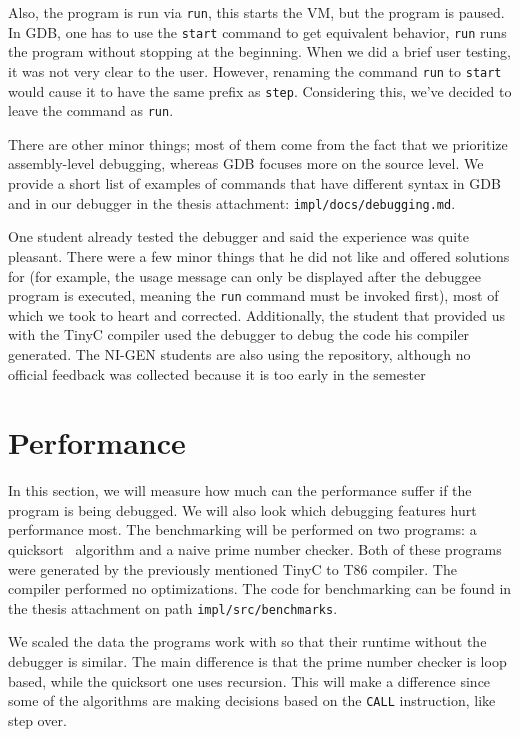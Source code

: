Also, the program is run via \texttt{run}, this starts the VM, but the program
is paused. In GDB, one has to use the \texttt{start} command to get equivalent
behavior, \texttt{run} runs the program without stopping at the beginning. When
we did a brief user testing, it was not very clear to the user. However,
renaming the command \texttt{run} to \texttt{start} would cause it to have the
same prefix as \texttt{step}. Considering this, we've decided to leave the
command as \texttt{run}.

There are other minor things; most of them come from the fact that we
prioritize assembly-level debugging, whereas GDB focuses more on the source
level. We provide a short list of examples of commands that have different
syntax in GDB and in our debugger in the thesis attachment:
\texttt{impl/docs/debugging.md}.

One student already tested the debugger and said the experience was quite
pleasant. There were a few minor things that he did not like and offered
solutions for (for example, the usage message can only be displayed after the
debuggee program is executed, meaning the \texttt{run} command must be invoked
first), most of which we took to heart and corrected. Additionally, the student
that provided us with the TinyC compiler used the debugger to debug the code
his compiler generated. The NI-GEN students are also using the repository,
although no official feedback was collected because it is too early in the
semester

\section{Performance}\label{section:benchmark}
In this section, we will measure how much can the performance suffer if the
program is being debugged. We will also look which debugging features hurt
performance most. The benchmarking will be performed on two programs: a
quicksort~\cite{quicksort} algorithm and a naive prime number checker. Both of
these programs were generated by the previously mentioned TinyC to T86
compiler. The compiler performed no optimizations. The code for
benchmarking can be found in the thesis attachment on path
\texttt{impl/src/benchmarks}.

We scaled the data the programs work with so that their runtime without the
debugger is similar. The main difference is that the prime number checker is
loop based, while the quicksort one uses recursion. This will make a difference
since some of the algorithms are making decisions based on the \texttt{CALL}
instruction, like step over.

